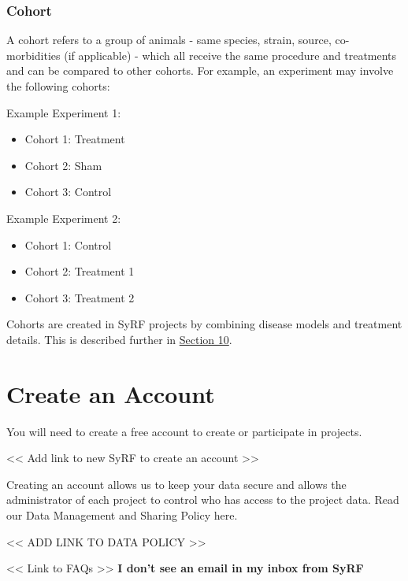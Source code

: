 \documentclass[
]{book}
\providecommand{\tightlist}{%
  \setlength{\itemsep}{0pt}\setlength{\parskip}{0pt}}
\begin{document}
\hypertarget{cohort}{%
\subsection{Cohort}\label{cohort}}

A cohort refers to a group of animals - same species, strain, source, co-morbidities (if applicable) - which all receive the same procedure and treatments and can be compared to other cohorts. For example, an experiment may involve the following cohorts:

Example Experiment 1:

\begin{itemize}
\tightlist
\item
  Cohort 1: Treatment
\item
  Cohort 2: Sham
\item
  Cohort 3: Control
\end{itemize}

Example Experiment 2:

\begin{itemize}
\tightlist
\item
  Cohort 1: Control
\item
  Cohort 2: Treatment 1
\item
  Cohort 3: Treatment 2
\end{itemize}

Cohorts are created in SyRF projects by combining disease models and treatment details. This is described further in \href{https://camaradesuk.github.io/syrf_userguide/projectannotation.html}{Section 10}.

\hypertarget{createAccount}{%
\chapter{Create an Account}\label{createAccount}}

You will need to create a free account to create or participate in projects.

\textless{}\textless{} Add link to new SyRF to create an account \textgreater{}\textgreater{}

Creating an account allows us to keep your data secure and allows the administrator of each project to control who has access to the project data. Read our Data Management and Sharing Policy here.

\textless{}\textless{} ADD LINK TO DATA POLICY \textgreater{}\textgreater{}

\textless{}\textless{} Link to FAQs \textgreater{}\textgreater{}
\textbf{I don't see an email in my inbox from SyRF}
\end{document}
